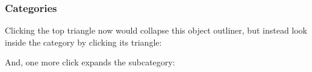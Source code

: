\documentclass[letterpaper,10pt,english]{sphinxmanual}
\begin{document}
\subsubsection{Categories}
\label{howtoprg:categories}
Clicking the top triangle now would collapse this object outliner, but instead look inside the category
by clicking its triangle:
\begin{figure}[htbp]\begin{flushleft}

\end{flushleft}\end{figure}

And, one more click expands the subcategory:
\begin{figure}[htbp]\begin{flushleft}

\end{flushleft}\end{figure}
\end{document}
